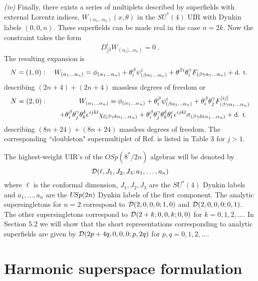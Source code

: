 \documentclass[a4paper,12pt]{article}
\begin{document}
{\sl (iv)} Finally, there exists a series of multiplets described 
by superfields with external Lorentz indices, 
$W_{(\alpha_1\ldots\alpha_n)}(x,\theta)$ in the  $SU^*(4)$ UIR 
with Dynkin labels $(0,0,n)$. These superfields can be made real 
in the case $n=2k$. Now the constraint takes the form 
\begin{equation}\label{21}
  D^i_{[\beta}W_{(\alpha_1]\ldots\alpha_n)} = 0\;.
\end{equation}
The resulting expansion is 
\begin{equation}\label{22}
N=(1,0):\quad    W_{(\alpha_1\ldots\alpha_n)} = 
\phi_{(\alpha_1\ldots\alpha_n)} + \theta^\beta_i 
\psi^i_{(\beta\alpha_1\ldots\alpha_n)} + \theta^{\beta 
i}\theta^\gamma_i F_{(\beta\gamma\alpha_1\ldots\alpha_n)} + 
\mbox{\small d. t. } 
\end{equation}
describing $(2n+4)+(2n+4)$ massless degrees of freedom or
\begin{eqnarray}
  N=(2,0): &&   W_{(\alpha_1\ldots\alpha_n)} = \phi_{(\alpha_1\ldots\alpha_n)} + 
\theta^\beta_i \psi^i_{(\beta\alpha_1\ldots\alpha_n)} + 
\theta^{\beta}_i\theta^\gamma_j 
F^{[ij]}_{(\beta\gamma\alpha_1\ldots\alpha_n)} \label{23}\\ 
  &&\ \ \ + \theta^\beta_i 
\theta^\gamma_j \theta^\delta_k 
\epsilon^{ijkl}\chi_{l(\beta\gamma\delta\alpha_1\ldots\alpha_n)} + 
\theta^\beta_i \theta^\gamma_j \theta^\delta_k\theta^\varepsilon_l 
\epsilon^{ijkl}\sigma_{(\beta\gamma\delta\varepsilon\alpha_1\ldots\alpha_n)} 
+ \mbox{\small d. t. } \nonumber  
\end{eqnarray}
describing $(8n+24)+(8n+24)$ massless degrees of freedom. The 
corresponding ``doubleton" supermultiplet of Ref. \cite{GT} is 
listed in Table 3 for $j>1$.  

The highest-weight UIR's of the $OSp(8^*/2n)$ algebras will be denoted by 
$$
{\cal D}(\ell,J_1,J_2,J_3;a_1,\ldots, a_n)
$$
where $\ell$ is the conformal dimension, $J_1,J_2,J_3$ are the 
$SU^*(4)$ Dynkin labels and $a_1,\ldots, a_n$ are the $U\hskip-2pt
Sp(2n)$  Dynkin labels of the first component. The analytic 
supersingletons for $n=2$ correspond to ${\cal D}(2,0,0,0;1,0)$ 
and ${\cal D}(2,0,0,0;0,1)$. The other supersingletons correspond 
to ${\cal D}(2+k,0,0,k;0,0)$ for $k=0,1,2,\ldots$. In Section 5.2 
we will show that the short representations corresponding to 
analytic superfields are given by ${\cal D}(2p+4q,0,0,0;p,2q)$ for 
$p,q=0,1,2,\ldots$. 



\section{Harmonic superspace formulation}
\end{document}
